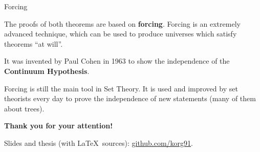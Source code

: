 \documentclass{beamer}
\theoremstyle{num.custom-title}
\theoremstyle{custom-title}
\renewcommand{\emph}[1]{\textbf{#1}}
\begin{document}
\begin{frame}{Forcing}

The proofs of both theorems are based on \emph{forcing}. Forcing is an extremely advanced technique, which can be used to produce universes which satisfy theorems ``at will''.

It was invented by Paul Cohen in 1963 to show the independence of the \emph{Continuum Hypothesis}.

Forcing is still the main tool in Set Theory. It is used and improved by set theorists every day to prove the independence of new statements (many of them about trees).

\end{frame}


\begin{frame}[plain]

\begin{center}
\Large \textbf{Thank you for your attention!}
\end{center}

\vspace{30pt}

Slides and thesis (with \LaTeX\ sources): \url{github.com/korg91}.

\vspace{15pt}

\ccbysa
\end{frame}
\end{document}

